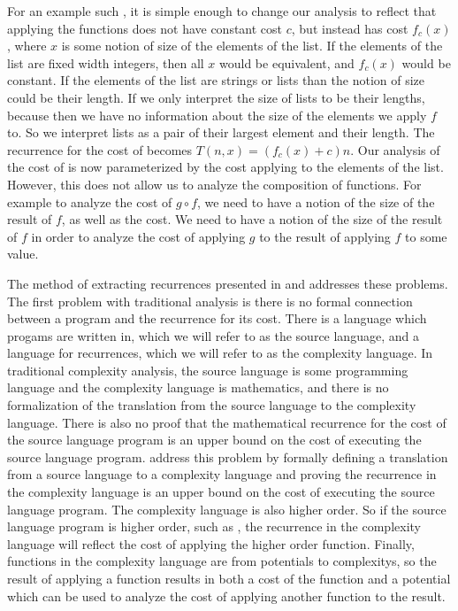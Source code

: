 For an example such , it is simple enough to change our analysis to
reflect that applying the functions  does not have constant cost $c$, but
instead has cost $f_c(x)$, where $x$ is some notion of size of the elements of
the list. If the elements of the list are fixed width integers, then all $x$
would be equivalent, and $f_c(x)$ would be constant. If the elements of the
list are strings or lists than the notion of size could be their
length. If we only interpret the size of lists to be their lengths,
because then we have no information about the size of the elements we apply $f$
to. So we interpret lists as a pair of their largest element and their length. The
recurrence for the cost of  becomes $T(n,x) = (f_c(x) + c)n$. Our
analysis of the cost of  is now parameterized by the cost applying 
to the elements of the list. However, this does not allow us to analyze the
composition of functions. For example to analyze the cost of $g \circ f$, we
need to have a notion of the size of the result of $f$, as well as the cost. We
need to have a notion of the size of the result of $f$ in order to analyze the
cost of applying $g$ to the result of applying $f$ to some value.

The method of extracting recurrences presented in \citet{Danner2013} and
\citet{Danner2015} addresses these problems. The first problem with traditional
analysis is there is no formal connection between a program and the recurrence
for its cost. There is a language which progams are written in, which we will
refer to as the source language, and a language for recurrences, which we will
refer to as the complexity language. In traditional complexity analysis, the
source language is some programming language and the complexity language is
mathematics, and there is no formalization of the translation from the source
language to the complexity language.  There is also no proof that the
mathematical recurrence for the cost of the source language program is an upper
bound on the cost of executing the source language program.  \citet{Danner2013}
address this problem by formally defining a translation from a source language
to a complexity language and proving the recurrence in the complexity language
is an upper bound on the cost of executing the source language program. The
complexity language is also higher order. So if the source language program is
higher order, such as , the recurrence in the complexity language will
reflect the cost of applying the higher order function. Finally, functions in
the complexity language are from potentials to complexitys, so the result of
applying a function results in both a cost of the function and a potential
which can be used to analyze the cost of applying another function to the
result.

